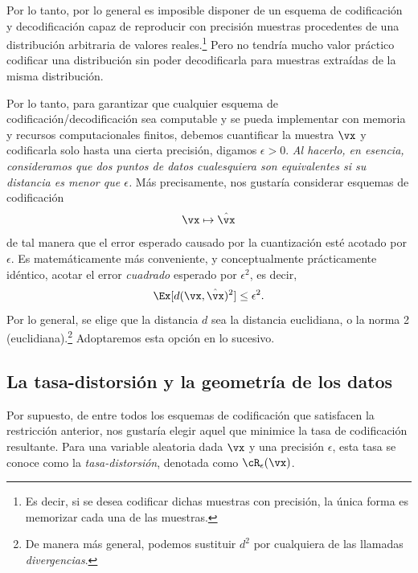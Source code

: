 \documentclass[../../book-main.tex]{subfiles}
\begin{document}
Por lo tanto, por lo general es imposible disponer de un esquema de codificación y decodificación
capaz de reproducir con precisión muestras procedentes de una distribución
arbitraria de valores reales.\footnote{Es decir, si se desea codificar
    dichas muestras con precisión, la única forma es memorizar cada una de las
muestras.} Pero no tendría mucho valor práctico codificar una
distribución sin poder decodificarla para muestras extraídas de la
misma distribución.

Por lo tanto, para garantizar que cualquier esquema de codificación/decodificación sea computable y se pueda implementar
con memoria y recursos computacionales finitos, debemos cuantificar
la muestra $\vx$ y codificarla solo hasta una cierta precisión, digamos
$\epsilon > 0$. {\em Al hacerlo, en esencia, consideramos que dos puntos de datos cualesquiera
son equivalentes si su distancia es menor que $\epsilon$.} Más
precisamente, nos gustaría considerar esquemas de codificación
\begin{equation}
    \vx \mapsto \hat \vx
\end{equation}
de tal manera que el error esperado causado por la cuantización esté acotado por
$\epsilon$. Es matemáticamente más conveniente, y conceptualmente
prácticamente idéntico, acotar el error \textit{cuadrado} esperado por
\(\epsilon^{2}\), es decir,
\begin{equation}
    \Ex[d(\vx, \hat \vx)^{2}] \le \epsilon^{2}.
\end{equation}
Por lo general, se elige que la distancia \(d\) sea la distancia euclidiana, o la
norma 2 (euclidiana).\footnote{De manera más general, podemos sustituir \(d^{2}\) por cualquiera
de las llamadas \textit{divergencias}.} Adoptaremos esta opción en lo sucesivo.

\subsection{La tasa-distorsión y la geometría de los datos}
Por supuesto, de entre todos los esquemas de codificación que satisfacen la restricción anterior,
nos gustaría elegir aquel que minimice la tasa de codificación resultante. Para
una variable aleatoria dada $\vx$ y una precisión $\epsilon$, esta tasa se conoce como
la \textit{tasa-distorsión}, denotada como $\cR_{\epsilon}(\vx)$.
\end{document}
